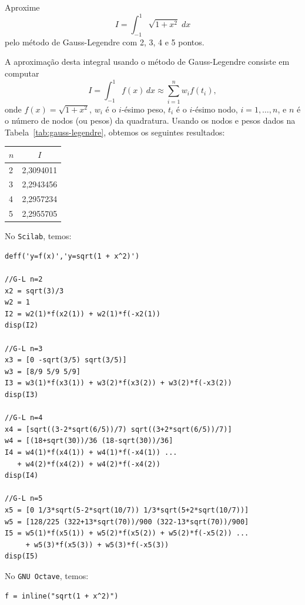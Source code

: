 \begin{ex} Aproxime
  \begin{equation*}
    I = \int_{-1}^1\sqrt{1+x^2}\;dx
  \end{equation*}
pelo método de Gauss-Legendre com 2, 3, 4 e 5 pontos.
\end{ex}
\begin{sol}
  A aproximação desta integral usando o método de Gauss-Legendre consiste em computar
  \begin{equation*}
    I = \int_{-1}^1 f(x)\,dx \approx \sum_{i=1}^n w_if(t_i),
  \end{equation*}
onde $f(x) = \sqrt{1 + x^2}$, $w_i$ é o $i$-ésimo peso, $t_i$ é o $i$-ésimo nodo, $i=1, \dotsc, n$, e $n$ é o número de nodos (ou pesos) da quadratura. Usando os nodos e pesos dados na Tabela~\ref{tab:gauss-legendre}, obtemos os seguintes resultados:
\begin{center}
  \begin{tabular}{l|c}
    $n$ & $I$ \\\hline
    2 & 2,3094011\\
    3 & 2,2943456\\
    4 & 2,2957234\\
    5 & 2,2955705\\\hline
  \end{tabular}
\end{center}

\ifisscilab
No \verb+Scilab+, temos:
\begin{verbatim}
deff('y=f(x)','y=sqrt(1 + x^2)')

//G-L n=2
x2 = sqrt(3)/3
w2 = 1
I2 = w2(1)*f(x2(1)) + w2(1)*f(-x2(1))
disp(I2)

//G-L n=3
x3 = [0 -sqrt(3/5) sqrt(3/5)]
w3 = [8/9 5/9 5/9]
I3 = w3(1)*f(x3(1)) + w3(2)*f(x3(2)) + w3(2)*f(-x3(2))
disp(I3)

//G-L n=4
x4 = [sqrt((3-2*sqrt(6/5))/7) sqrt((3+2*sqrt(6/5))/7)]
w4 = [(18+sqrt(30))/36 (18-sqrt(30))/36]
I4 = w4(1)*f(x4(1)) + w4(1)*f(-x4(1)) ...
   + w4(2)*f(x4(2)) + w4(2)*f(-x4(2))
disp(I4)

//G-L n=5
x5 = [0 1/3*sqrt(5-2*sqrt(10/7)) 1/3*sqrt(5+2*sqrt(10/7))]
w5 = [128/225 (322+13*sqrt(70))/900 (322-13*sqrt(70))/900]
I5 = w5(1)*f(x5(1)) + w5(2)*f(x5(2)) + w5(2)*f(-x5(2)) ...
     + w5(3)*f(x5(3)) + w5(3)*f(-x5(3))
disp(I5)
\end{verbatim}
\fi
\ifisoctave
No \verb+GNU Octave+, temos:
\begin{verbatim}
f = inline("sqrt(1 + x^2)")


\end{verbatim}
\end{sol}
